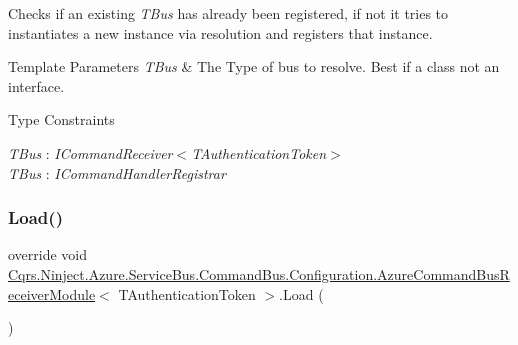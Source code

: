 Checks if an existing {\itshape T\+Bus}  has already been registered, if not it tries to instantiates a new instance via resolution and registers that instance. 


\begin{DoxyTemplParams}{Template Parameters}
{\em T\+Bus} & The Type of bus to resolve. Best if a class not an interface.\\
\hline
\end{DoxyTemplParams}
\begin{Desc}
\item[Type Constraints]\begin{description}
\item[{\em T\+Bus} : {\em I\+Command\+Receiver$<$T\+Authentication\+Token$>$}]\item[{\em T\+Bus} : {\em I\+Command\+Handler\+Registrar}]\end{description}
\end{Desc}
\mbox{\label{classCqrs_1_1Ninject_1_1Azure_1_1ServiceBus_1_1CommandBus_1_1Configuration_1_1AzureCommandBusReceiverModule_a61b7d4b1fbabc6b1e4d8943f55116a51_a61b7d4b1fbabc6b1e4d8943f55116a51}} 
\subsubsection{\texorpdfstring{Load()}{Load()}}
{\footnotesize\ttfamily override void \hyperlink{classCqrs_1_1Ninject_1_1Azure_1_1ServiceBus_1_1CommandBus_1_1Configuration_1_1AzureCommandBusReceiverModule}{Cqrs.\+Ninject.\+Azure.\+Service\+Bus.\+Command\+Bus.\+Configuration.\+Azure\+Command\+Bus\+Receiver\+Module}$<$ T\+Authentication\+Token $>$.Load (\begin{DoxyParamCaption}{ }\end{DoxyParamCaption})}



